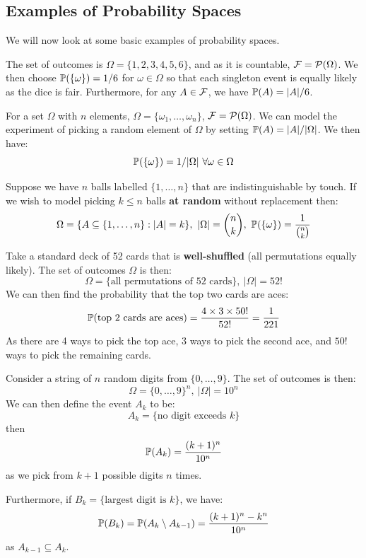 \documentclass[../main.tex]{subfiles}
\begin{document}
\subsection{Examples of Probability Spaces}
We will now look at some basic examples of probability spaces.
\begin{example}
  The set of outcomes is $\Omega = \{1, 2, 3, 4, 5, 6\}$, and as it is countable, $\salg = \powerset{\Omega}$.
  We then choose $\P(\{\omega\}) = 1/6$ for $\omega \in \Omega$ so that each singleton event is equally likely as the dice is fair.
  Furthermore, for any $A \in \salg$, we have $\P(A) = |A|/6$.
\end{example}
\begin{example}
  For a set $\Omega$ with $n$ elements, $\Omega = \{\omega_1, \ldots, \omega_n\}$, $\salg = \powerset{\Omega}$.
  We can model the experiment of picking a random element of $\Omega$ by setting $\P(A) = |A|/|\Omega|$.
  We then have:
  \[
    \P(\{\omega\}) = 1/|\Omega|\ \forall \omega \in \Omega
  \]
\end{example}
\begin{example}
  Suppose we have $n$ balls labelled $\{1, \ldots, n\}$ that are indistinguishable by touch.
  If we wish to model picking $k \leq n$ balls \textbf{at random} without replacement then:
  \[
    \Omega = \{A \subseteq \{1, \ldots, n\}: |A| = k\},\ |\Omega| = \binom{n}{k},\ \P(\{\omega\}) = \frac{1}{\binom{n}{k}}
  \]
\end{example}
\begin{example}
  Take a standard deck of 52 cards that is \textbf{well-shuffled} (all permutations equally likely).
  The set of outcomes $\Omega$ is then:
  \[
    \Omega = \{\text{all permutations of 52 cards}\},\ |\Omega| = 52!
  \]
  We can then find the probability that the top two cards are aces:
  \[
    \P(\text{top 2 cards are aces}) = \frac{4 \times 3 \times 50!}{52!} = \frac{1}{221}
  \]
  As there are 4 ways to pick the top ace, 3 ways to pick the second ace, and $50!$ ways to pick the remaining cards.
\end{example}
\begin{example}
  Consider a string of $n$ random digits from $\{0, \ldots, 9\}$.
  The set of outcomes is then:
  \[
    \Omega = \{0, \ldots, 9\}^n,\ |\Omega| = 10^n
  \]
  We can then define the event $A_k$ to be:
  \[
    A_k = \{\text{no digit exceeds $k$}\}
  \]
  then
  \[
    \P(A_k) = \frac{(k + 1)^n}{10^n}
  \]
  as we pick from $k + 1$ possible digits $n$ times.

  Furthermore, if $B_k = \{\text{largest digit is $k$}\}$, we have:
  \[
    \P(B_k) = \P(A_k \setminus A_{k - 1}) = \frac{(k + 1)^n - k^n}{10^n}
  \]
  as $A_{k - 1} \subseteq A_k$.
\end{example}
\end{document}
